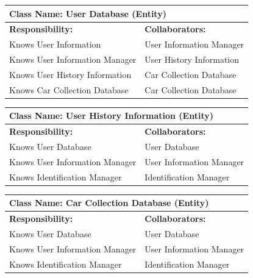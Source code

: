 \documentclass[]{article}
\begin{document}
\begin{table}[ht]
    \centering
    \begin{tabular}{|p{7cm}|p{7cm}|}
        \hline
        \multicolumn{2}{|l|}{\textbf{Class Name: User Database (Entity)}} \\
        \hline
        \textbf{Responsibility:} & \textbf{Collaborators:} \\
        \hline
        Knows User Information & User Information Manager \\
        Knows User Information Manager & User History Information \\
        Knows User History Information & Car Collection Database \\
        Knows Car Collection Database & Car Collection Database \\
        \hline
    \end{tabular}
\end{table}

\begin{table}[ht]
    \centering
    \begin{tabular}{|p{7cm}|p{7cm}|}
        \hline
        \multicolumn{2}{|l|}{\textbf{Class Name: User History Information (Entity)}} \\
        \hline
        \textbf{Responsibility:} & \textbf{Collaborators:} \\
        \hline
        Knows User Database & User Database \\
        Knows User Information Manager & User Information Manager \\
        Knows Identification Manager & Identification Manager \\
        \hline
    \end{tabular}
\end{table}
 
\begin{table}[ht]
    \centering
    \begin{tabular}{|p{7cm}|p{7cm}|}
        \hline
        \multicolumn{2}{|l|}{\textbf{Class Name: Car Collection Database (Entity)}} \\
        \hline
        \textbf{Responsibility:} & \textbf{Collaborators:} \\
        \hline
        Knows User Database & User Database \\
        Knows User Information Manager & User Information Manager \\
        Knows Identification Manager & Identification Manager \\
        \hline
    \end{tabular}
\end{table}
\end{document}
